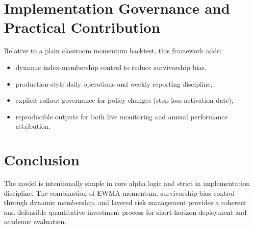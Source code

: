 \documentclass[11pt]{article}
\begin{document}
\section{Implementation Governance and Practical Contribution}
Relative to a plain classroom momentum backtest, this framework adds:
\begin{itemize}[leftmargin=1.5em]
    \item dynamic index-membership control to reduce survivorship bias,
    \item production-style daily operations and weekly reporting discipline,
    \item explicit rollout governance for policy changes (stop-loss activation date),
    \item reproducible outputs for both live monitoring and annual performance attribution.
\end{itemize}

\section{Conclusion}
The model is intentionally simple in core alpha logic and strict in implementation discipline. The combination of EWMA momentum, survivorship-bias control through dynamic membership, and layered risk management provides a coherent and defensible quantitative investment process for short-horizon deployment and academic evaluation.
\end{document}
